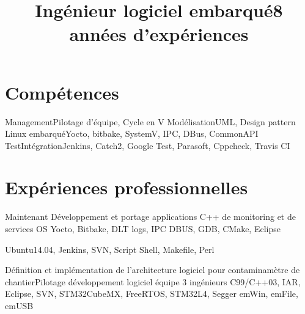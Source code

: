 \documentclass[10pt, a4paper, sans]{moderncv}
\title{Ingénieur logiciel embarqué\newline \large 8 années d'expériences}
\begin{document}
\makecvtitle

\section{Compétences}

	{Management}{Pilotage d'équipe, Cycle en V}
	{Modélisation}{UML, Design pattern}
	{Linux embarqué}{Yocto, bitbake, SystemV, IPC, DBus, CommonAPI}
	{Test\newline Intégration}{Jenkins, Catch2, Google Test, Parasoft, Cppcheck, Travis CI}

\section{Expériences professionnelles}


	{Maintenant Développement et portage applications C++ de monitoring et de services OS}
	{Yocto, Bitbake, DLT logs, IPC DBUS, GDB, CMake, Eclipse}
	
	{Ubuntu14.04, Jenkins, SVN, Script Shell, Makefile, Perl}{}

	{Définition et implémentation de l’architecture logiciel pour contaminamètre de chantier}{Pilotage développement logiciel équipe 3 ingénieurs}
	{C99/C++03, IAR, Eclipse, SVN, STM32CubeMX, FreeRTOS, STM32L4, Segger emWin, emFile, emUSB}
\end{document}

